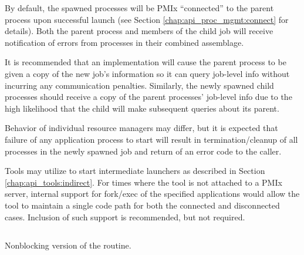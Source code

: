 By default, the spawned processes will be PMIx ``connected'' to the parent process upon successful launch (see Section \ref{chap:api_proc_mgmt:connect}
for details).  
Both the parent process and members of the child job will receive notification of errors from processes in their combined assemblage.

\adviceimplstart
It is recommended that an implementation will cause the parent process to be given a copy of the new job's
information so it can query job-level info without incurring any communication penalties.  Similarly, the newly 
spawned child processes should receive a copy of the parent processes' job-level info due to the high likelihood 
that the child will make subsequent queries about its parent.
\adviceimplend

\adviceuserstart
Behavior of individual resource managers may differ, but it is expected that failure of any application process to start will result in termination/cleanup of all processes in the newly spawned job and return of an error code to the caller.
\adviceuserend

\adviceimplstart
Tools may utilize  to start intermediate launchers as described in Section \ref{chap:api_tools:indirect}. For times where the tool is not attached to a \ac{PMIx} server, internal support for fork/exec of the specified applications would allow the tool to maintain a single code path for both the connected and disconnected cases. Inclusion of such support is recommended, but not required.
\adviceimplend


\subsection{}

\summary

Nonblocking version of the  routine.

\format


